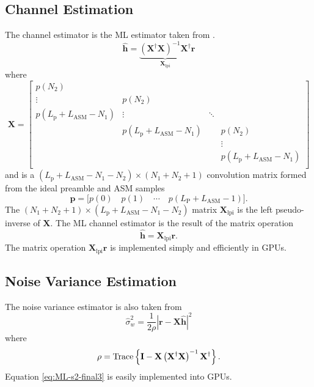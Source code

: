 \subsection{Channel Estimation}
\label{sec:channel_estimation}
The channel estimator is the ML estimator taken from \cite[eq. 8]{rice-afran-saquib-cole-rhodes-moazzami:2014}.
\begin{equation}
\hat{\mathbf{h}} = \underbrace{ \left( \mathbf{X}^\dag\mathbf{X} \right)^{-1} \mathbf{X}^\dag}_{\mathbf{X}_\text{lpi}}\mathbf{r}
\end{equation}
where 
\begin{equation}
\mathbf{X} = 
		\begin{bmatrix}
		p(N_2)							& 								& 		&  			\\
		\vdots 							& p(N_2)						& 		&  			\\
		p(L_\text{p}+L_\text{ASM}-N_1)	&\vdots							& \ddots&  			\\
										& p(L_\text{p}+L_\text{ASM}-N_1)&  		& p(N_2)  	\\
		 								&  								&  		& \vdots 	\\
		 								&  	   							&  		& p(L_\text{p}+L_\text{ASM}-N_1)\\
	\end{bmatrix}
\end{equation}
and
is a $(L_\text{p}+L_\text{ASM}-N_1-N_2)\times(N_1+N_2+1)$ convolution matrix formed from the ideal preamble and ASM samples
\begin{equation}
\mathbf{p} = \big[ p(0) \quad p(1) \quad \cdots  \quad  p(L_\text{P} + L_\text{ASM}-1) \big].
\label{eq:preamble_ASM}
\end{equation}
The $(N_1+N_2+1)\times(L_\text{p}+L_\text{ASM}-N_1-N_2)$ matrix $\mathbf{X}_\text{lpi}$ is the left pseudo-inverse of $\mathbf{X}$.
The ML channel estimator is the result of the matrix operation
\begin{equation}
\hat{\mathbf{h}} = \mathbf{X}_\text{lpi} \mathbf{r}.
\end{equation}
The matrix operation $\mathbf{X}_\text{lpi} \mathbf{r}$ is implemented simply and efficiently in GPUs.


\subsection{Noise Variance Estimation}
\label{sec:noise_variance_estimation}
The noise variance estimator is also taken from \cite[eq. 9]{rice-afran-saquib-cole-rhodes-moazzami:2014}
\begin{equation}
	\hat{\sigma}_w^2 = \frac{1}{2\rho} \left| \mathbf{r}-\mathbf{X}\hat{\mathbf{h}}\right|^2
	\label{eq:ML-s2-final3}
\end{equation}
where
\begin{equation}
	\rho = {\rm Trace} \left\{ \mathbf{I} -  \mathbf{X}\left(\mathbf{X}^\dag\mathbf{X}\right)^{-1}\mathbf{X}^\dag \right\}.
\end{equation}
Equation \eqref{eq:ML-s2-final3} is easily implemented into GPUs.


